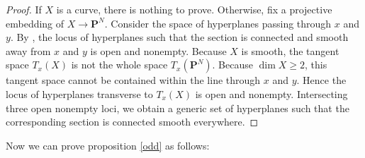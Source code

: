 \documentclass{article}
\theoremstyle{definition}
\begin{document}
	\begin{proof}
		If $X$ is a curve, there is nothing to prove. Otherwise, fix a projective embedding of $X \to \mathbf{P}^N$. Consider the space of hyperplanes passing through $x$ and $y$. By \cite[Remark 10.9.2, Exercise 11.3]{heartshorne}, the locus of hyperplanes such that the section is connected and smooth away from $x$ and $y$ is open and nonempty. Because $X$ is smooth, the tangent space $T_x(X)$ is not the whole space $T_x(\mathbf{P}^N)$. Because $\dim X \geq 2$, this tangent space cannot be contained within the line through $x$ and $y$. Hence the locus of hyperplanes transverse to $T_x(X)$ is open and nonempty. Intersecting three open nonempty loci, we obtain a generic set of hyperplanes such that the corresponding section is connected smooth everywhere.
	\end{proof}
	Now we can prove proposition \ref{odd} as follows:
\end{document}
